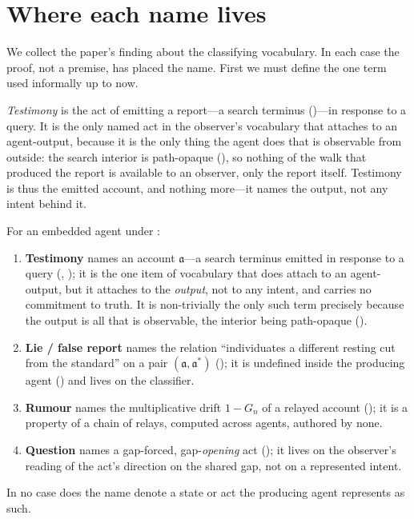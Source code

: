 \documentclass[11pt,twocolumn,a4paper]{article}
\newcommand{\acct}{\mathfrak{a}}   %
\begin{document}
\section{Where each name lives}
\label{sec:vocabulary}

We collect the paper's finding about the classifying vocabulary. In each
case the proof, not a premise, has placed the name. First we must define the
one term used informally up to now.

\begin{definition}[Testimony]
\label{def:testimony}
\emph{Testimony} is the act of emitting a report---a search terminus
()---in response to a query. It is the only named
act in the observer's vocabulary that attaches to an agent-output, because
it is the only thing the agent does that is observable from outside: the
search interior is path-opaque (), so
nothing of the walk that produced the report is available to an observer,
only the report itself. Testimony is thus the emitted account, and nothing
more---it names the output, not any intent behind it.
\end{definition}

\begin{theorem}
\label{thm:locus}
For an embedded agent under :
\begin{enumerate}[label=\textup{(\roman*)},leftmargin=2.2em]
\item \textbf{Testimony} names an account $\acct$---a search terminus
emitted in response to a query (, );
it is the one item of vocabulary that does attach to an agent-output, but it
attaches to the \emph{output}, not to any intent, and carries no commitment
to truth. It is non-trivially the only such term precisely because the
output is all that is observable, the interior being path-opaque
().
\item \textbf{Lie / false report} names the relation ``individuates a
different resting cut from the standard'' on a pair $(\acct,\acct^\ast)$
(); it is undefined inside the producing agent
() and lives on the classifier.
\item \textbf{Rumour} names the multiplicative drift $1-G_n$ of a relayed
account (); it is a property of a chain of
relays, computed across agents, authored by none.
\item \textbf{Question} names a gap-forced, gap-\emph{opening} act
(); it lives on the
observer's reading of the act's direction on the shared gap, not on a
represented intent.
\end{enumerate}
In no case does the name denote a state or act the producing agent
represents as such.
\end{theorem}
\end{document}
